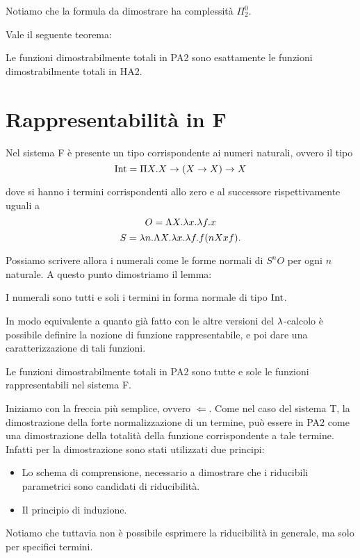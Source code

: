 \documentclass[]{marticle}
\begin{document}
Notiamo che la formula da dimostrare ha complessit\`a $\Pi^0_2$.

Vale il seguente teorema:
\begin{block}[Teorema]
    Le funzioni dimostrabilmente totali in PA2 sono esattamente le funzioni
    dimostrabilmente totali in HA2.
\end{block}


\section{Rappresentabilit\`a in F}

Nel sistema F \`e presente un tipo corrispondente ai numeri naturali, ovvero il
tipo
\[
    \text{Int} = \Pi X. X \rightarrow (X \rightarrow X) \rightarrow X
\]

dove si hanno i termini corrispondenti allo zero e al successore rispettivamente
uguali a
\[
    O = \Lambda X. \lambda x. \lambda f. x
\]
\[
    S = \lambda n. \Lambda X. \lambda x. \lambda f. f (nXxf).
\]

Possiamo scrivere allora i numerali come le forme normali di $S^nO$ per ogni $n$
naturale. A questo punto dimostriamo il lemma:

\begin{block}[Lemma]
    I numerali sono tutti e soli i termini in forma normale di tipo $\text{Int}$. 
\end{block}


In modo equivalente a quanto gi\`a fatto con le altre versioni del $\lambda$-calcolo
\`e possibile definire la nozione di funzione rappresentabile, e poi dare una
caratterizzazione di tali funzioni.

\begin{block}[Teorema]
    Le funzioni dimostrabilmente totali in PA2 sono tutte e sole le
    funzioni rappresentabili nel sistema F.
\end{block}

Iniziamo con la freccia pi\`u semplice, ovvero $\Leftarrow$. Come nel caso del
sistema T, la dimostrazione della forte normalizzazione di un termine, pu\`o
essere  in PA2 come una dimostrazione della totalit\`a della
funzione corrispondente a tale termine. Infatti per la dimostrazione sono stati
utilizzati due principi:
\begin{itemize}
    \item Lo schema di comprensione, necessario a dimostrare che i riducibili
        parametrici sono candidati di riducibilit\`a. 
    \item Il principio di induzione.
\end{itemize}
Notiamo che tuttavia non \`e possibile esprimere la riducibilit\`a in generale,
ma solo per specifici termini.
\end{document}
